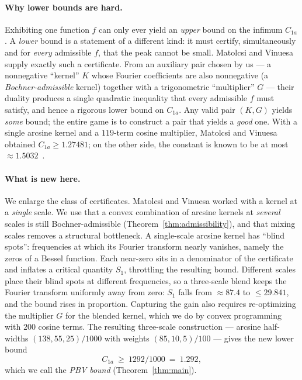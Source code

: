 \documentclass[11pt, letterpaper]{article}
\theoremstyle{paperplain}
\theoremstyle{paperdef}
\begin{document}
\paragraph{Why lower bounds are hard.}
Exhibiting one function $f$ can only ever yield an \emph{upper} bound
on the infimum $C_{1a}$.  A \emph{lower} bound is a statement of a
different kind: it must certify, simultaneously and for \emph{every}
admissible $f$, that the peak cannot be small.  Matolcsi and
Vinuesa~\cite{MV10} supply exactly such a certificate.  From an
auxiliary pair chosen by us --- a nonnegative ``kernel'' $K$ whose
Fourier coefficients are also nonnegative (a \emph{Bochner-admissible}
kernel) together with a trigonometric ``multiplier'' $G$ --- their
duality produces a single quadratic inequality that every admissible
$f$ must satisfy, and hence a rigorous lower bound on $C_{1a}$.  Any
valid pair $(K,G)$ yields \emph{some} bound; the entire game is to
construct a pair that yields a \emph{good} one.  With a single arcsine
kernel and a $119$-term cosine multiplier, Matolcsi and Vinuesa
obtained $C_{1a}\ge 1.27481$; on the other side, the constant is known
to be at most $\approx 1.5032$~\cite{AlphaEvolve25}.

\paragraph{What is new here.}
We enlarge the class of certificates.  Matolcsi and Vinuesa worked with
a kernel at a \emph{single} scale.  We use that a convex combination of
arcsine kernels at \emph{several} scales is still Bochner-admissible
(Theorem~\ref{thm:admissibility}), and that mixing scales removes a
structural bottleneck.  A single-scale arcsine kernel has ``blind
spots'': frequencies at which its Fourier transform nearly vanishes,
namely the zeros of a Bessel function.  Each near-zero sits in a
denominator of the certificate and inflates a critical quantity
$S_1$, throttling the resulting bound.  Different scales place their
blind spots at different frequencies, so a three-scale blend keeps the
Fourier transform uniformly away from zero: $S_1$ falls from
$\approx 87.4$ to $\le 29.841$, and the bound rises in proportion.
Capturing the gain also requires re-optimizing the multiplier $G$ for
the blended kernel, which we do by convex programming with $200$
cosine terms.  The resulting three-scale construction --- arcsine
half-widths $(138,55,25)/1000$ with weights $(85,10,5)/100$ --- gives
the new lower bound
\[
  C_{1a}\ \ge\ 1292/1000\ =\ 1.292,
\]
which we call the \emph{PBV bound} (Theorem~\ref{thm:main}).
\end{document}
